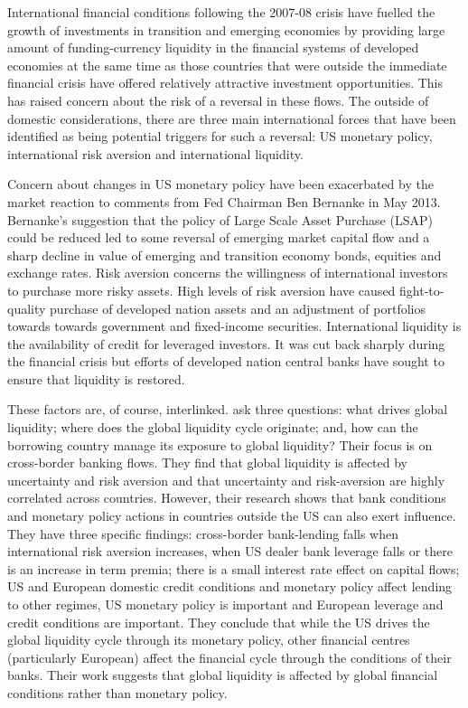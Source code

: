 \documentclass[12pt, a4paper, oneside]{article} %
\begin{document}

International financial conditions following the 2007-08 crisis have fuelled the growth of investments in transition and emerging economies by providing large amount of funding-currency liquidity in the financial systems of developed economies at the same time as those countries that were outside the immediate financial crisis have offered relatively attractive investment opportunities.   This has raised concern about the risk of a reversal in these flows.  The outside of domestic considerations, there are three main international forces that have been identified as being potential triggers for such a reversal:  US monetary policy, international risk aversion and international liquidity. 

Concern about changes in US monetary policy have been exacerbated by the market reaction to comments from Fed Chairman Ben Bernanke in May 2013. %
Bernanke's suggestion that the policy of Large Scale Asset Purchase (LSAP) could be reduced led to some reversal of emerging market capital flow and a sharp decline in value of emerging and transition economy bonds, equities and exchange rates.  Risk aversion concerns the willingness of international investors to purchase more risky assets.  High levels of risk aversion have caused fight-to-quality purchase of developed nation assets and an adjustment of portfolios towards towards government and fixed-income securities. International liquidity is the availability of credit for leveraged investors.  It was cut back sharply during the financial crisis but efforts of developed nation central banks have sought to ensure that liquidity is restored.  

These factors are, of course, interlinked.  \citet{Cerutti2014} ask three questions:  what drives global liquidity; where does the global liquidity cycle originate; and, how can the borrowing country manage its exposure to global liquidity? Their focus is on cross-border banking flows. They find that global liquidity is affected by uncertainty and risk aversion and that uncertainty and risk-aversion are highly correlated across countries. However, their research shows that bank conditions and monetary policy actions in countries outside the US can also exert influence. They have three specific findings:  cross-border bank-lending falls when international risk aversion increases, when US dealer bank leverage falls or there is an increase in term premia; there is a small interest rate effect on capital flows; US and European domestic credit conditions and monetary policy affect lending to other regimes, US monetary policy is important and European leverage and credit conditions are important.  They conclude that while the US drives the global liquidity cycle through its monetary policy, other financial centres (particularly European) affect the financial cycle through the conditions of their banks. Their work suggests that global liquidity is affected by global financial conditions rather than monetary policy.
\end{document}
